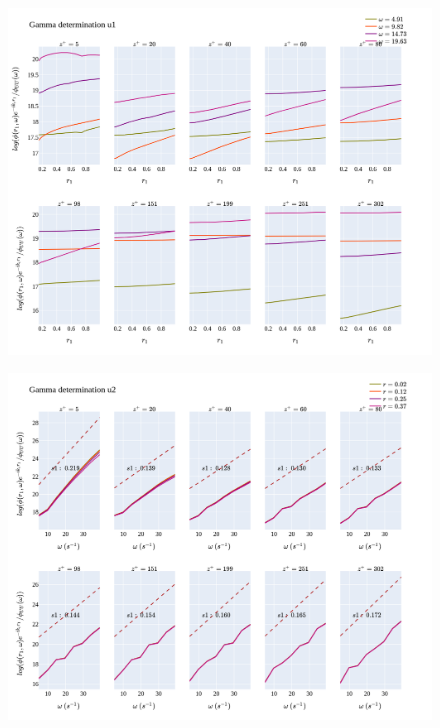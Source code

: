 \documentclass[]{article}
\theoremstyle{plain}
\theoremstyle{remark}
\begin{document}
\begin{figure}[H]
	\begin{center}
		\includegraphics[width=\textwidth]{../../output/figures/channel_wrles_retau395/split_time/gamma/gamma_u1_r_all.png}
	\end{center}
\end{figure}

\begin{figure}[H]
	\begin{center}
		\includegraphics[width=\textwidth]{../../output/figures/channel_wrles_retau395/split_time/gamma/gamma_u2_w_all.png}
	\end{center}
\end{figure}
\end{document}
